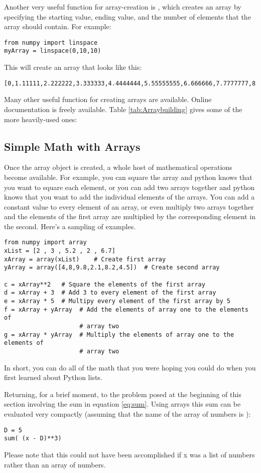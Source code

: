  Another very useful function for array-creation is ,
which creates an array by specifying the starting value, ending value,
and the number of elements that the array should contain.  For example:
\begin{Verbatim}
from numpy import linspace
myArray = linspace(0,10,10)
\end{Verbatim}
This will create an array that looks like this:
\begin{Verbatim}
[0,1.11111,2.222222,3.333333,4.4444444,5.55555555,6.666666,7.7777777,8.8888888,10]
\end{Verbatim}
Many other useful function for creating arrays are available.  Online
documentation is freely available.  Table \ref{tab:Arraybuilding} gives some of the more
heavily-used ones:

\subsection*{Simple Math with Arrays}
Once the array object is created, a whole host of mathematical
operations become available.  For example, you can square the array
and python knows that you want to square each element, or you can add
two arrays together and python knows that you want to add the
individual elements of the arrays.  You can add a constant value to
every element of an array, or even multiply two arrays together and
the elements of the first array are multiplied by the corresponding
element in the second.  Here's a sampling of examples.
\begin{Verbatim}
from numpy import array
xList = [2 , 3 , 5.2 , 2 , 6.7]
xArray = array(xList)    # Create first array
yArray = array([4,8,9.8,2.1,8.2,4.5])  # Create second array

c = xArray**2   # Square the elements of the first array
d = xArray + 3  # Add 3 to every element of the first array
e = xArray * 5  # Multipy every element of the first array by 5
f = xArray + yArray  # Add the elements of array one to the elements of
                     # array two
g = xArray * yArray  # Multiply the elements of array one to the elements of
                     # array two
\end{Verbatim}
In short, you can do all of the math that you were hoping you could do
when you first learned about Python lists.

Returning, for a brief moment, to the problem posed at the beginning
of this section involving the sum in equation \ref{eq:sum}.  Using
arrays this sum can be evaluated very compactly (assuming that the
name of the array of numbers is ):
\begin{Verbatim}
D = 5
sum( (x - D)**3) 
\end{Verbatim}
Please note that this could not have been accomplished if x was a list
of numbers rather than an array of numbers.


